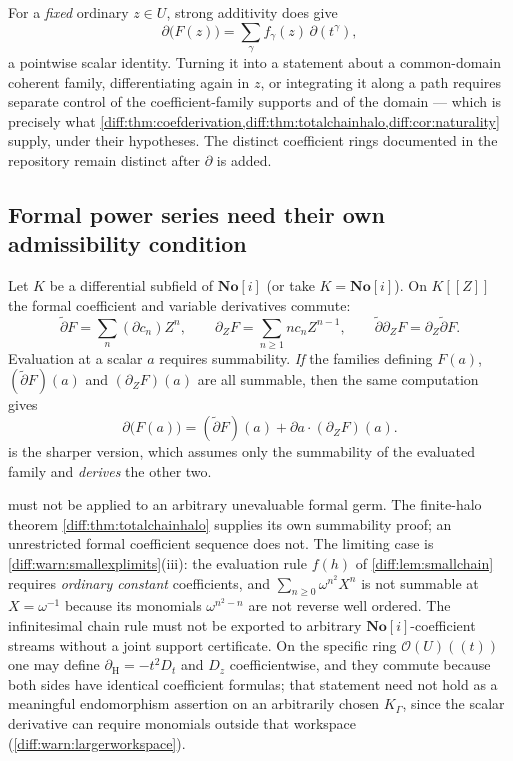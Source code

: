 \documentclass[11pt,letterpaper]{article}
\numberwithin{equation}{section}
\theoremstyle{definition}
\theoremstyle{remark}
\newcommand{\SC}{\mathbf{No}[i]}
\newcommand{\der}{\partial}
\newcommand{\Hol}{\mathscr O}
\newcommand{\dercoef}{\der_{\mathrm H}}
\newcommand{\dertil}{\widetilde{\der}}
\newcommand{\derZ}{\der_{Z}}
\newcommand{\Dz}{D_{z}}
\begin{document}
\begin{remark}
\label{diff:rem:pointwiseonly}
For a \emph{fixed} ordinary $z\in U$, strong additivity does give
\[
 \der\bigl(F(z)\bigr)=\sum_{\gamma}f_{\gamma}(z)\,\der(t^{\gamma}),
\]
a pointwise scalar identity. Turning it into a statement about a common-domain
coherent family, differentiating again in $z$, or integrating it along a path
requires separate control of the coefficient-family supports and of the domain
--- which is precisely what
\cref{diff:thm:coefderivation,diff:thm:totalchainhalo,diff:cor:naturality}
supply, under their hypotheses. The distinct coefficient rings documented in
the repository remain distinct after $\der$ is added.
\end{remark}

\subsection{Formal power series need their own admissibility condition}
\label{diff:sub:formaladmissibility}

Let $K$ be a differential subfield of $\SC$ (or take $K=\SC$).
On $K[[Z]]$ the formal coefficient and variable derivatives commute:
\[
 \dertil F=\sum_{n}(\der c_{n})Z^{n},
 \qquad
 \derZ F=\sum_{n\geq1}n c_{n}Z^{n-1},
 \qquad
 \dertil\derZ F=\derZ\dertil F .
\]
Evaluation at a scalar $a$ requires summability. \emph{If} the families
defining $F(a)$, $(\dertil F)(a)$ and $(\derZ F)(a)$ are all summable, then the
same computation gives
\begin{equation}\label{diff:eq:formaladmissible}
 \der\bigl(F(a)\bigr)=(\dertil F)(a)+\der a\cdot(\derZ F)(a).
\end{equation}
 is the sharper version, which assumes only the
summability of the evaluated family and \emph{derives} the other two.

\begin{warning}
\label{diff:rem:coefstream}
 must not be applied to an arbitrary
unevaluable formal germ. The finite-halo theorem
\cref{diff:thm:totalchainhalo} supplies its own summability proof; an
unrestricted formal coefficient sequence does not. The limiting case is
\cref{diff:warn:smallexplimits}(iii): the evaluation rule $f(h)$ of
\cref{diff:lem:smallchain} requires \emph{ordinary constant} coefficients, and
$\sum_{n\geq0}\omega^{n^{2}}X^{n}$ is not summable at $X=\omega^{-1}$ because
its monomials $\omega^{n^{2}-n}$ are not reverse well ordered. The
infinitesimal chain rule must not be exported to arbitrary
$\SC$-coefficient streams without a joint support certificate. On the specific
ring $\Hol(U)((t))$ one may define $\dercoef=-t^{2}D_{t}$ and $\Dz$
coefficientwise, and they commute because both sides have identical
coefficient formulas; that statement need not hold as a meaningful endomorphism
assertion on an arbitrarily chosen $K_{\Gamma}$, since the scalar derivative
can require monomials outside that workspace
(\cref{diff:warn:largerworkspace}).
\end{warning}
\end{document}
